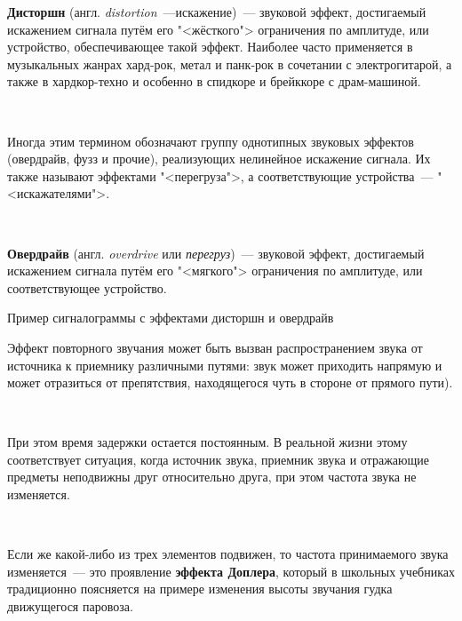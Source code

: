 \documentclass{beamer}
\begin{document}
\begin{frame}
  \textbf{Дисторшн} (англ. \textit{distortion}~---искажение)~--- звуковой эффект, достигаемый искажением сигнала путём его "<жёсткого"> ограничения по амплитуде, или устройство, обеспечивающее такой эффект. Наиболее часто применяется в музыкальных жанрах хард-рок, метал и панк-рок в сочетании с электрогитарой, а также в хардкор-техно и особенно в спидкоре и брейккоре с драм-машиной. 
  
  ~
  
  Иногда этим термином обозначают группу однотипных звуковых эффектов (овердрайв, фузз и прочие), реализующих нелинейное искажение сигнала. Их также называют эффектами "<перегруза">, а соответствующие устройства~--- "<искажателями">.

  ~
 
  \textbf{Овердрайв} (англ. \textit{overdrive} или \textit{перегруз})~--- звуковой эффект, достигаемый искажением сигнала путём его "<мягкого"> ограничения по амплитуде, или соответствующее устройство.
 \end{frame}

\begin{frame}
  \begin{block}{Пример сигналограммы с эффектами дисторшн и овердрайв}
  \end{block}
\end{frame}

\begin{frame}
  Эффект повторного звучания может быть вызван распространением звука от источника к приемнику различными путями: звук может приходить напрямую и может отразиться от препятствия, находящегося чуть в стороне от прямого пути).

  ~
  
 При этом время задержки остается постоянным. В реальной жизни этому соответствует ситуация, когда источник звука, приемник звука и отражающие предметы неподвижны друг относительно друга, при этом частота звука не изменяется.

 ~
 
 Если же какой-либо из трех элементов подвижен, то частота принимаемого звука изменяется~--- это проявление \textbf{эффекта Доплера}, который в школьных учебниках традиционно поясняется на примере изменения высоты звучания гудка движущегося паровоза.
\end{frame}
\end{document}
